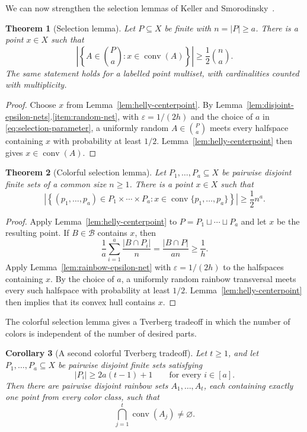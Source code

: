 \documentclass[11pt]{article}
\newtheorem{thm}{Theorem}[section]%
\newtheorem{cor}[thm]{Corollary}
\theoremstyle{definition}
\newcommand{\B}{\mathcal{B}}
\newcommand{\conv}{\operatorname{conv}}
\begin{document}
We can now strengthen the selection lemmas of Keller and
Smorodinsky~\cite{keller2026colorful}.

\begin{thm}[Selection lemma]\label{thm:separable-selection}
Let $P\subseteq X$ be finite with $n=|P|\ge a$.  There is a point
$x\in X$ such that
\[
\left|
\left\{
A\in\binom{P}{a}:x\in\conv(A)
\right\}
\right|
\ge \frac12\binom{n}{a}.
\]
The same statement holds for a labelled point multiset, with
cardinalities counted with multiplicity.
\end{thm}

\begin{proof}
Choose $x$ from Lemma~\ref{lem:helly-centerpoint}.  By
Lemma~\ref{lem:disjoint-epsilon-nets}.\ref{item:random-net}, with
$\varepsilon=1/(2h)$ and the choice of $a$ in
\eqref{eq:selection-parameter}, a uniformly random
$A\in\binom{P}{a}$ meets every halfspace containing $x$ with
probability at least $1/2$.  Lemma~\ref{lem:helly-centerpoint} then gives $x\in\conv(A)$.
\end{proof}

\begin{thm}[Colorful selection lemma]
\label{thm:separable-colorful-selection}
Let $P_1,\ldots,P_a\subseteq X$ be pairwise disjoint finite sets of a
common size $n\ge1$.  There is a point $x\in X$ such that
\[
\left|
\left\{
(p_1,\ldots,p_a)\in P_1\times\cdots\times P_a:
x\in\conv\{p_1,\ldots,p_a\}
\right\}
\right|
\ge \frac12 n^a.
\]
\end{thm}

\begin{proof}
Apply Lemma~\ref{lem:helly-centerpoint} to
$P=P_1\sqcup\cdots\sqcup P_a$
and let $x$ be the resulting point.  If $B\in\B$ contains $x$, then
\[
\frac1a\sum_{i=1}^a\frac{|B\cap P_i|}{n}
=
\frac{|B\cap P|}{an}
\ge\frac1h.
\]
Apply Lemma~\ref{lem:rainbow-epsilon-net} with
$\varepsilon=1/(2h)$ to the halfspaces containing $x$.  By the choice
of $a$, a uniformly random rainbow transversal meets every such
halfspace with probability at least $1/2$. 
Lemma~\ref{lem:helly-centerpoint} then implies that its convex hull
contains $x$.
\end{proof}

The colorful selection lemma gives a Tverberg tradeoff in which the
number of colors is independent of the number of desired parts.

\begin{cor}[A second colorful Tverberg tradeoff]
\label{cor:separable-colorful-tverberg-tradeoff}
Let $t\ge1$, and let $P_1,\ldots,P_a\subseteq X$ be pairwise disjoint
finite sets satisfying
\[
|P_i|\ge 2a(t-1)+1
\qquad\text{for every }i\in[a].
\]
Then there are pairwise disjoint rainbow sets
$A_1,\ldots,A_t$, each containing exactly one point from every color
class, such that
\[
\bigcap_{j=1}^t\conv(A_j)\ne\varnothing.
\]
\end{cor}
\end{document}
